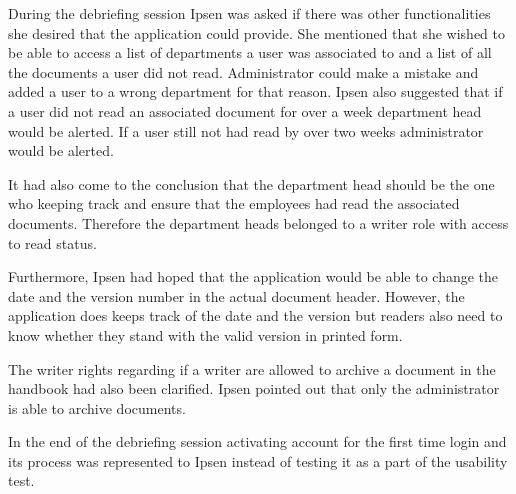 
During the debriefing session Ipsen was asked if there was other functionalities she desired that the application could provide.
She mentioned that she wished to be able to access a list of departments a user was associated to and a list of all the documents a user did not read.
Administrator could make a mistake and added a user to a wrong department for that reason.
Ipsen also suggested that if a user did not read an associated document for over a week department head would be alerted.
If a user still not had read by over two weeks administrator would be alerted.

It had also come to the conclusion that the department head should be the one who keeping track and ensure that the employees had read the associated documents.
Therefore the department heads belonged to a writer role with access to read status.

Furthermore, Ipsen had hoped that the application would be able to change the date and the version number in the actual document header.
However, the application does keeps track of the date and the version but readers also need to know whether they stand with the valid version in printed form.

The writer rights regarding if a writer are allowed to archive a document in the handbook had also been clarified.
Ipsen pointed out that only the administrator is able to archive documents.

In the end of the debriefing session activating account for the first time login and its process was represented to Ipsen instead of testing it as a part of the usability test.




